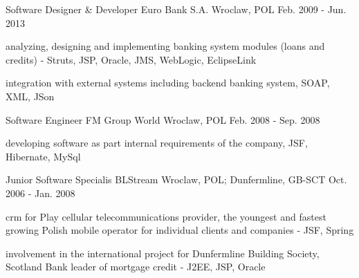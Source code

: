 \begin{cventries}
  \cventry
    {Software Designer \& Developer} %
    {Euro Bank S.A.} %
    {Wroclaw, POL} %
    {Feb. 2009 - Jun. 2013} %
    {
      \begin{cvitems} %
        \item {analyzing, designing and implementing banking system modules (loans and credits) - Struts, JSP, Oracle, JMS, WebLogic, EclipseLink }
        \item {integration with external systems including backend banking system, SOAP, XML, JSon}
      \end{cvitems}
    }


  \cventry
    {Software Engineer} %
    {FM Group World} %
    {Wroclaw, POL} %
    {Feb. 2008 - Sep. 2008} %
    {
      \begin{cvitems} %
        \item {developing software as part internal requirements of the company, JSF, Hibernate, MySql}
      \end{cvitems}
    }

  \cventry
    {Junior Software Specialis} %
    {BLStream} %
    {Wroclaw, POL; Dunfermline, GB-SCT} %
    {Oct. 2006 - Jan. 2008} %
    {
      \begin{cvitems} %
        \item {crm for Play cellular telecommunications provider, the youngest and fastest growing Polish mobile operator for individual clients and companies - JSF, Spring}
        \item {involvement in the international project for Dunfermline Building Society, Scotland Bank leader of mortgage credit - J2EE, JSP, Oracle}
      \end{cvitems}
    }

\end{cventries}

